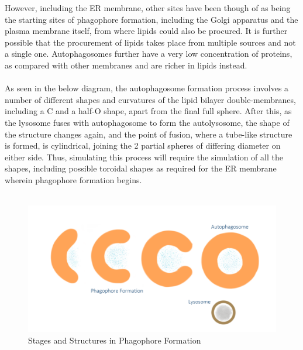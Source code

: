 \documentclass[12pt, a4paper]{report}
\begin{document}
However, including the ER membrane, other sites have been though of as being the starting sites of phagophore formation, including the Golgi apparatus and the plasma membrane itself, from where lipids could also be procured. It is further possible that the procurement of lipids takes place from multiple sources and not a single one. Autophagosomes further have a very low concentration of proteins, as compared with other membranes and are richer in lipids instead. 
\\~\\
As seen in the below diagram, the autophagosome formation process involves a number of different shapes and curvatures of the lipid bilayer double-membranes, including a C and a half-O shape, apart from the final full sphere. After this, as the lysosome fuses with autophagosome to form the autolysosome, the shape of the structure changes again, and the point of fusion, where a tube-like structure is formed, is cylindrical, joining the 2 partial spheres of differing diameter on either side. Thus, simulating this process will require the simulation of all the shapes, including possible toroidal shapes as required for the ER membrane wherein phagophore formation begins.
\\~\\
\begin{figure}[h]
\includegraphics[scale=0.5]{images/autophagy stages.png} 
\centering 
\caption{Stages and Structures in Phagophore Formation} 
\centering 
\end{figure} 
\end{document}
